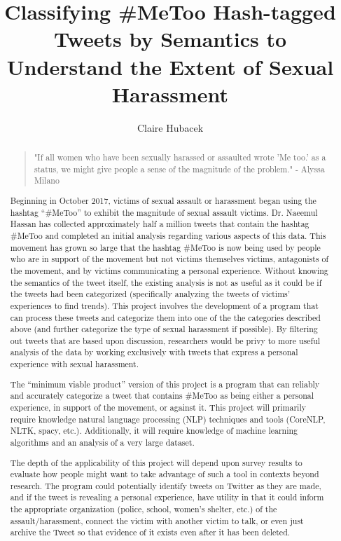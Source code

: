 \documentclass[letterpaper]{article}
\begin{document}
%
\title{Classifying \#MeToo Hash-tagged Tweets by Semantics to Understand the Extent of Sexual Harassment}
\author{Claire Hubacek}

\maketitle
\begin{abstract}
\begin{quote}
"If all women who have been sexually harassed or assaulted wrote 'Me too.' as a status, we might give people a sense of the magnitude of the problem." - Alyssa Milano
\end{quote}

Beginning in October 2017, victims of sexual assault or harassment began using the hashtag “\#MeToo” to exhibit the magnitude of sexual assault victims. Dr. Naeemul Hassan has collected approximately half a million tweets that contain the hashtag \#MeToo and completed an initial analysis regarding various aspects of this data. This movement has grown so large that the hashtag \#MeToo is now being used by people who are in support of the movement but not victims themselves victims, antagonists of the movement, and by victims communicating a personal experience. Without knowing the semantics of the tweet itself, the existing analysis is not as useful as it could be if the tweets had been categorized (specifically analyzing the tweets of victims’ experiences to find trends). This project involves the development of a program that can process these tweets and categorize them into one of the the categories described above (and further categorize the type of sexual harassment if possible). By filtering out tweets that are based upon discussion, researchers would be privy to more useful analysis of the data by working exclusively with tweets that express a personal experience with sexual harassment.

The “minimum viable product” version of this project is a program that can reliably and accurately categorize a tweet that contains \#MeToo as being either a personal experience, in support of the movement, or against it. This project will primarily require knowledge natural language processing (NLP) techniques and tools (CoreNLP, NLTK, spacy, etc.). Additionally, it will require knowledge of machine learning algorithms and an analysis of a very large dataset.

The depth of the applicability of this project will depend upon survey results to evaluate how people might want to take advantage of such a tool in contexts beyond research. The program could potentially identify tweets on Twitter as they are made, and if the tweet is revealing a personal experience, have utility in that it could inform the appropriate organization (police, school, women’s shelter, etc.) of the assault/harassment, connect the victim with another victim to talk, or even just archive the Tweet so that evidence of it exists even after it has been deleted.

\end{abstract}





\end{document}
